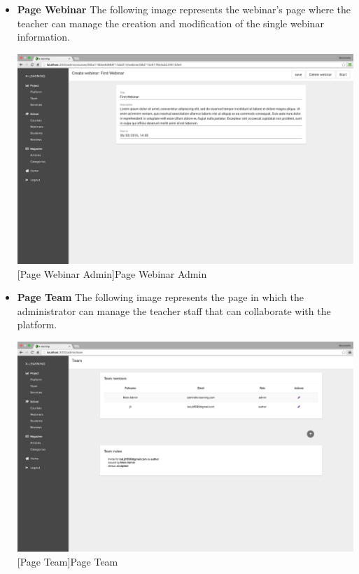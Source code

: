 \begin{itemize}
\item \textbf{Page Webinar} The following image represents the webinar's page where the teacher can manage the creation and modification of the single webinar information.
\par

\begin{minipage}{\linewidth}
    \centering
    \includegraphics[width=0.9\linewidth]{images/chapter4/page-webinar-admin.png}
    [Page Webinar Admin]{Page Webinar Admin}
\end{minipage}

\item \textbf{Page Team} The following image represents the page in which the administrator can manage the teacher staff that can collaborate with the platform.
\\
\par

\begin{minipage}{\linewidth}
    \centering
    \includegraphics[width=0.9\linewidth]{images/chapter4/page-team-admin.png}
    [Page Team]{Page Team}
\end{minipage}


\end{itemize}
